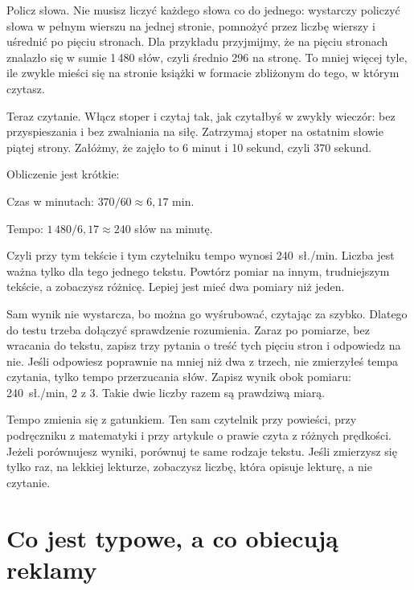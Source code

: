Policz słowa. Nie musisz liczyć każdego słowa co do jednego: wystarczy policzyć słowa w pełnym wierszu na jednej stronie, pomnożyć przez liczbę wierszy i uśrednić po pięciu stronach. Dla przykładu przyjmijmy, że na pięciu stronach znalazło się w sumie 1\,480 słów, czyli średnio 296 na stronę. To mniej więcej tyle, ile zwykle mieści się na stronie książki w formacie zbliżonym do tego, w którym czytasz.

Teraz czytanie. Włącz stoper i czytaj tak, jak czytałbyś w zwykły wieczór: bez przyspieszania i bez zwalniania na siłę. Zatrzymaj stoper na ostatnim słowie piątej strony. Załóżmy, że zajęło to 6 minut i 10 sekund, czyli 370 sekund.

Obliczenie jest krótkie:

\begin{przyklad}
Czas w minutach: $370 / 60 \approx 6{,}17$ min.

Tempo: $1\,480 / 6{,}17 \approx 240$ słów na minutę.

Czyli przy tym tekście i tym czytelniku tempo wynosi 240~sł./min. Liczba jest ważna tylko dla tego jednego tekstu. Powtórz pomiar na innym, trudniejszym tekście, a zobaczysz różnicę. Lepiej jest mieć dwa pomiary niż jeden.
\end{przyklad}

Sam wynik nie wystarcza, bo można go wyśrubować, czytając za szybko. Dlatego do testu trzeba dołączyć sprawdzenie rozumienia. Zaraz po pomiarze, bez wracania do tekstu, zapisz trzy pytania o treść tych pięciu stron i odpowiedz na nie. Jeśli odpowiesz poprawnie na mniej niż dwa z trzech, nie zmierzyłeś tempa czytania, tylko tempo przerzucania słów. Zapisz wynik obok pomiaru: 240~sł./min, 2 z 3. Takie dwie liczby razem są prawdziwą miarą.

\begin{zasada}
Tempo zmienia się z gatunkiem. Ten sam czytelnik przy powieści, przy podręczniku z matematyki i przy artykule o prawie czyta z różnych prędkości. Jeżeli porównujesz wyniki, porównuj te same rodzaje tekstu. Jeśli zmierzysz się tylko raz, na lekkiej lekturze, zobaczysz liczbę, która opisuje lekturę, a nie czytanie.
\end{zasada}

\section{Co jest typowe, a co obiecują reklamy}


